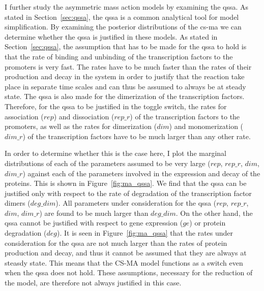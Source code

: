 I further study the asymmetric mass action models by examining the \acrshort{qssa}. As stated in Section~\ref{sec:qssa}, the \acrshort{qssa} is a common analytical tool for model simplification. By examining the posterior distributions of the \acrshort{cs-ma} we can determine whether the \acrshort{qssa} is justified in these models. As stated in Section~\ref{sec:qssa}, the assumption that has to be made for the \acrshort{qssa} to hold is that the rate of binding and unbinding of the transcription factors to the promoters is very fast. The rates have to be much faster than the rates of their production and decay in the system in order to justify that the reaction take place in separate time scales and can thus be assumed to always be at steady state. The \acrshort{qssa} is also made for the dimerization of the transcription factors. Therefore, for the \acrshort{qssa} to be justified in the toggle switch, the rates for association ($rep$) and dissociation ($rep\_r$) of the transcription factors to the promoters, as well as the rates for dimerization ($dim$) and monomerization ($dim\_r$) of the transcription factors have to be much larger than any other rate.


In order to determine whether this is the case here, I plot the marginal distributions of each of the parameters assumed to be very large ($rep$, $rep\_r$, $dim$, $dim\_r$) against each of the parameters involved in the expression and decay of the proteins. This is shown in Figure~\ref{fig:ma_qssa}. We find that the \acrshort{qssa} can be justified only with respect to the rate of degradation of the transcription factor dimers ($deg\_dim$). All parameters under consideration for the \acrshort{qssa} ($rep$, $rep\_r$, $dim$, $dim\_r$) are found to be much larger than $deg\_dim$. On the other hand, the \acrshort{qssa} cannot be justified with respect to gene expression ($ge$) or protein degradation ($deg$). It is seen in Figure~\ref{fig:ma_qssa} that the rates under consideration for the \acrshort{qssa} are not much larger than the rates of protein production and decay, and thus it cannot be assumed that they are always at steasdy state. This means that the CS-MA model functions as a switch even when the \acrshort{qssa} does not hold. These assumptions, necessary for the reduction of the model, are therefore not always justified in this case. 






